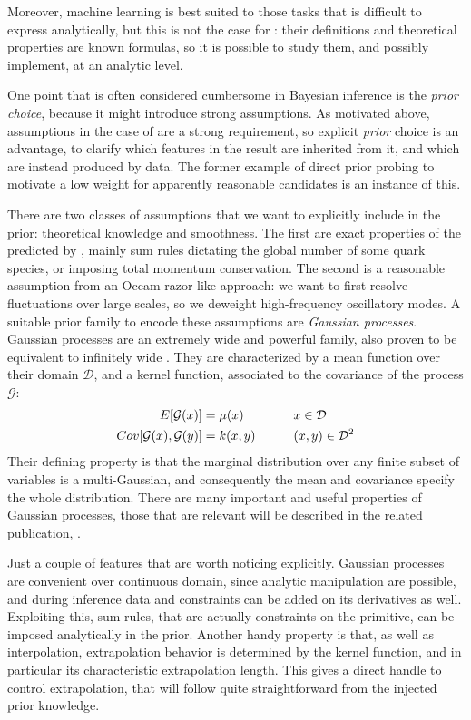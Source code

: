 Moreover, machine learning is best suited to those tasks that is difficult to
express analytically, but this is not the case for \pdfs: their definitions and
theoretical properties are known formulas, so it is possible to study them, and
possibly implement, at an analytic level.

One point that is often considered cumbersome in Bayesian inference is the
\textit{prior choice}, because it might introduce strong assumptions.
As motivated above, assumptions in the case of \pdfs are a strong requirement,
so explicit \textit{prior} choice is an advantage, to clarify which features in
the result are inherited from it, and which are instead produced by data.
The former example of direct prior probing to motivate a low weight for
apparently reasonable candidates is an instance of this.

There are two classes of assumptions that we want to explicitly include in the
prior: theoretical knowledge and smoothness.
%
The first are exact properties of the \pdfs predicted by \qcd, mainly sum rules
dictating the global number of some quark species, or imposing total momentum
conservation.
The second is a reasonable assumption from an Occam razor-like approach: we
want to first resolve fluctuations over large scales, so we deweight
high-frequency oscillatory modes.
%
A suitable prior family to encode these assumptions are \textit{Gaussian
processes}.
%
Gaussian processes are an extremely wide and powerful family, also proven to be
equivalent to infinitely wide \nn.
They are characterized by a mean function over their domain $\mathcal{D}$, and
a kernel function, associated to the covariance of the process $\mathcal{G}$:
\begin{alignat}{2}
  E\qty[\mathcal{G}(x)] &= \mu(x) \qquad &&x \in \mathcal{D}\\
  Cov\qty[\mathcal{G}(x),\mathcal{G}(y)] &= k(x, y) \qquad &&(x, y) \in \mathcal{D}^2
  \label{eq:gp/gp}
\end{alignat}
Their defining property is that the marginal distribution over any finite
subset of variables is a multi-Gaussian, and consequently the mean and
covariance specify the whole distribution.
%
There are many important and useful properties of Gaussian processes, those
that are relevant will be described in the related publication,
\cite{petrillo2022}.

Just a couple of features that are worth noticing explicitly.
%
Gaussian processes are convenient over continuous domain, since analytic
manipulation are possible, and during inference data and constraints can be
added on its derivatives as well.
Exploiting this, sum rules, that are actually constraints on the primitive, can
be imposed analytically in the prior.
%
Another handy property is that, as well as interpolation, extrapolation
behavior is determined by the kernel function, and in particular its
characteristic extrapolation length.
This gives a direct handle to control extrapolation, that will follow quite
straightforward from the injected prior knowledge.

